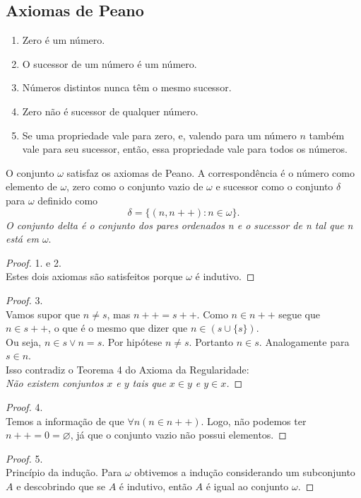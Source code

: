    \subsection{Axiomas de Peano}
      \begin{enumerate}[1.]
         \item Zero é um número.
         \item O sucessor de um número é um número.
         \item Números distintos nunca têm o mesmo sucessor.
         \item Zero não é sucessor de qualquer número.
         \item Se uma propriedade vale para zero, e, valendo para um
            número $n$ também vale para seu sucessor, então, essa
            propriedade vale para todos os números.
      \end{enumerate}
      \begin{theorem}
         O conjunto $\omega$ satisfaz os axiomas de Peano.
         A correspondência é o número como elemento de $\omega$, zero
         como o conjunto vazio de $\omega$ e sucessor como o conjunto 
         $\delta$ para $\omega$ definido como 
         $$\delta = \{(n, n++): n \in \omega\}.$$
         \emph{O conjunto delta é o conjunto dos pares ordenados 
         n e o sucessor de n tal que n está em $\omega$}.
         \begin{proof}
            1. e 2.\\
            Estes dois axiomas são satisfeitos porque $\omega$ é indutivo.
         \end{proof}
         \begin{proof}
            3.\\
            Vamos supor que $n \neq s$, mas $n++ = s++$.
            Como $n \in n++$ segue que $n \in s++$, o que é o mesmo que
            dizer que $n \in (s \cup \{s\}).$\\
            Ou seja, $n\in s \lor n = s$. Por hipótese $n \neq s$.
            Portanto $n \in s$. Analogamente para $s \in n$.\\
            Isso contradiz o Teorema 4 do Axioma da Regularidade:\\
            \emph{Não existem conjuntos $x$ e $y$ tais que 
            $x \in y$ e $y \in x$.}
         \end{proof}
         \begin{proof}
            4.\\
            Temos a informação de que $\forall n (n \in n++).$ Logo, não
            podemos ter $n++ = 0 = \varnothing$, já que o conjunto vazio
            não possui elementos.
         \end{proof}
      \end{theorem}
         \begin{proof}
            5.\\
            Princípio da indução. Para $\omega$ obtivemos a indução
            considerando um subconjunto $A$ e descobrindo que se $A$
            é indutivo, então $A$ é igual ao conjunto $\omega$.
         \end{proof}
